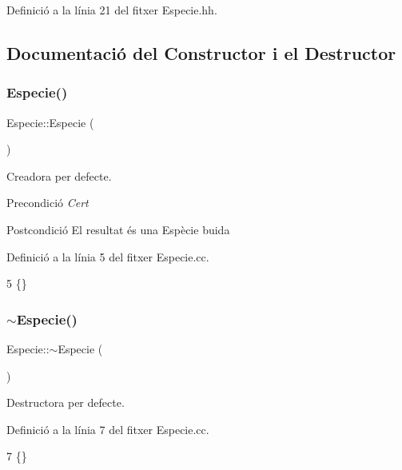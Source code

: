 Definició a la línia 21 del fitxer Especie.\+hh.



\subsection{Documentació del Constructor i el Destructor}
\mbox{\label{class_especie_a272c2488719cc9874b2f174906675b3d}} 
\subsubsection{\texorpdfstring{Especie()}{Especie()}}
{\footnotesize\ttfamily Especie\+::\+Especie (\begin{DoxyParamCaption}{ }\end{DoxyParamCaption})}



Creadora per defecte. 

\begin{DoxyPrecond}{Precondició}
{\itshape Cert} 
\end{DoxyPrecond}
\begin{DoxyPostcond}{Postcondició}
El resultat és una Espècie buida 
\end{DoxyPostcond}


Definició a la línia 5 del fitxer Especie.\+cc.


\begin{DoxyCode}
5 \{\}
\end{DoxyCode}
\mbox{\label{class_especie_abd21378dde6e8348d823c6f87a1c0658}} 
\subsubsection{\texorpdfstring{$\sim$\+Especie()}{~Especie()}}
{\footnotesize\ttfamily Especie\+::$\sim$\+Especie (\begin{DoxyParamCaption}{ }\end{DoxyParamCaption})}



Destructora per defecte. 



Definició a la línia 7 del fitxer Especie.\+cc.


\begin{DoxyCode}
7 \{\}
\end{DoxyCode}


